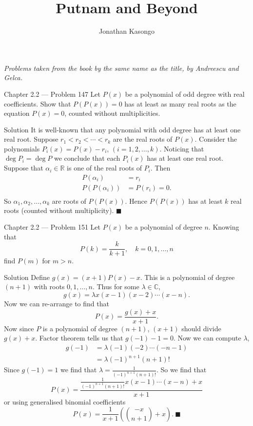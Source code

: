 \documentclass{article}
\author{Jonathan Kasongo}
\title{Putnam and Beyond}
\begin{document}
\maketitle

\textit{Problems taken from the book by the same name as the title,
by Andreescu and Gelca.}

\begin{problem}{Chapter 2.2 --- Problem 147}
Let $P(x)$ be a polynomial of odd degree with real coefficients. Show
that $P(P(x)) = 0$ has at least as many real roots as the equation
$P(x) = 0$, counted without multiplicities.
\end{problem}

\begin{solution}{Solution}
It is well-known that any polynomial with odd degree has at least one real
root. Suppose $r_1 < r_2 < \cdots < r_k$ are the real roots of $P(x)$.
Consider the polynomials $P_i(x) = P(x) - r_i$, $(i=1,2,\ldots,k)$.
Noticing that $\deg P_i = \deg P$ we conclude that each $P_i(x)$ has
at least one real root. Suppose that $\alpha_i \in \mathbb{R}$ is one of
the real roots of $P_i$. Then
\[
\begin{aligned}
P(\alpha_i) &= r_i \\
P(P(\alpha_i)) &= P(r_i) = 0. \\
\end{aligned}
\]
So $\alpha_1, \alpha_2, \ldots, \alpha_k$ are roots of $P(P(x))$. Hence
$P(P(x))$ has at least $k$ real roots (counted without multiplicity).
$\blacksquare$
\end{solution}
\newpage

\begin{problem}{Chapter 2.2 --- Problem 151}
Let $P(x)$ be a polynomial of degree $n$. Knowing that
$$
P(k) = \frac{k}{k+1}, \quad k=0,1,\ldots,n
$$
find $P(m)$ for $m > n$.
\end{problem}

\begin{solution}{Solution}
Define $g(x) = (x+1)P(x) - x$. This is a polynomial of degree $(n+1)$
with roots $0,1,\ldots, n$. Thus for some $\lambda \in \mathbb{C}$,
$$
g(x) = \lambda x(x-1)(x-2)\cdots(x-n).
$$
Now we can re-arrange to find that
$$
P(x) = \frac{g(x) + x}{x+1}.
$$
Now since $P$ is a polynomial of degree $(n+1)$, $(x+1)$ should divide
$g(x) + x$. Factor theorem tells us that $g(-1) -1 = 0$. Now we can
compute $\lambda$,
\[
\begin{aligned}
g(-1) &= \lambda (-1)(-2)\cdots(-n-1) \\
&= \lambda (-1)^{n+1} (n+1)!
\end{aligned}
\]
Since $g(-1) = 1$ we find that $\lambda = \frac{1}{(-1)^{n+1} (n+1)!}$.
So we find that
$$
P(x) = \frac{\frac{1}{(-1)^{n+1} (n+1)!}x(x-1)\cdots(x-n) + x}{x + 1}
$$
or using generalised binomial coefficients
$$
P(x) = \frac{1}{x+1}\left( \binom{-x}{n+1} + x \right). \ \blacksquare
$$
\end{solution}
\newpage
\end{document}
